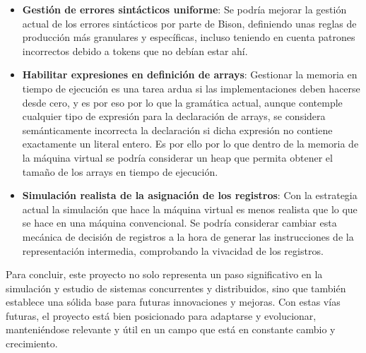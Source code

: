 \begin{itemize}
    \item \textbf{Gestión de errores sintácticos uniforme}: Se podría mejorar la gestión actual de los errores sintácticos por parte de Bison, definiendo unas reglas de producción más granulares y específicas, incluso teniendo en cuenta patrones incorrectos debido a tokens que no debían estar ahí.
    \item \textbf{Habilitar expresiones en definición de arrays}: Gestionar la memoria en tiempo de ejecución es una tarea ardua si las implementaciones deben hacerse desde cero, y es por eso por lo que la gramática actual, aunque contemple cualquier tipo de expresión para la declaración de arrays, se considera semánticamente incorrecta la declaración si dicha expresión no contiene exactamente un literal entero. Es por ello por lo que dentro de la memoria de la máquina virtual se podría considerar un heap que permita obtener el tamaño de los arrays en tiempo de ejecución.
    \item \textbf{Simulación realista de la asignación de los registros}: Con la estrategia actual la simulación que hace la máquina virtual es menos realista que lo que se hace en una máquina convencional. Se podría considerar cambiar esta mecánica de decisión de registros a la hora de generar las instrucciones de la representación intermedia, comprobando la vivacidad de los registros.
\end{itemize}

Para concluir, este proyecto no solo representa un paso significativo en la simulación y estudio de sistemas concurrentes y distribuidos, sino que también establece una sólida base para futuras innovaciones y mejoras. Con estas vías futuras, el proyecto está bien posicionado para adaptarse y evolucionar, manteniéndose relevante y útil en un campo que está en constante cambio y crecimiento.